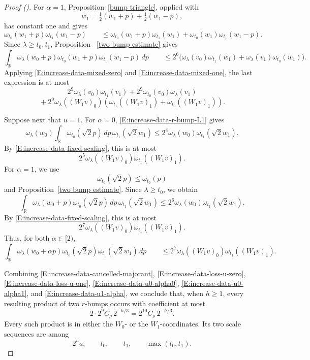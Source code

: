 \documentclass[12pt,reqno]{amsart}
\newcommand{\auto}{{({\tiny\faCar})}}
\theoremstyle{plain}
\numberwithin{equation}{section}
\theoremstyle{remark}
\begin{document}
\begin{proof}[Proof \auto]
For \(\alpha=1\), Proposition~\ref{bump triangle}, applied with
\[
w_1
=
\tfrac12(w_1+p)+\tfrac12(w_1-p),
\]
has constant one and gives
\begin{equation}
    \label{E:increase-data-narrow-triangle}
    \omega_{t_0}(w_1+p) \omega_{t_1}(w_1-p) \qquad\leq \omega_{t_0}(w_1+p)\omega_{t_1}(w_1) + \omega_{t_0}(w_1)\omega_{t_1}(w_1-p).
\end{equation}
Since \(\lambda\geq t_0,t_1\), Proposition~
\ref{two bump estimate} gives
\[
\int_{\mathbb R} \omega_\lambda(w_0+p) \omega_{t_0}(w_1+p) \omega_{t_1}(w_1-p)\,dp \qquad\leq 2^6\Big( \omega_\lambda(v_0)\omega_{t_1}(w_1) + \omega_\lambda(v_1)\omega_{t_0}(w_1) \Big).
\]
Applying \eqref{E:increase-data-mixed-zero} and
\eqref{E:increase-data-mixed-one}, the last expression is at most
\begin{equation}
    \label{E:increase-data-u0-alpha1}
2^9\omega_\lambda(v_0)\omega_{t_1}(v_1)
+2^9\omega_{t_0}(v_0)\omega_\lambda(v_1)
\end{equation}
\[
{}+2^9\omega_\lambda((W_1v)_0)
\left(
\omega_{t_1}((W_1v)_1)
+
\omega_{t_0}((W_1v)_1)
\right).
\]

Suppose next that \(u=1\). For \(\alpha=0\),
\eqref{E:increase-data-r-bump-L1} gives
\[
\omega_\lambda(w_0)
\int_{\mathbb R}\omega_{t_0}(\sqrt2p)\,dp\,
\omega_{t_1}(\sqrt2w_1)
\leq
2^4\omega_\lambda(w_0)\omega_{t_1}(\sqrt2w_1).
\]
By \eqref{E:increase-data-fixed-scaling}, this is at most
\[
2^5\omega_\lambda((W_1v)_0)\omega_{t_1}((W_1v)_1).
\]
For \(\alpha=1\), we use
\[
\omega_{t_0}(\sqrt2p)\leq\omega_{t_0}(p)
\]
and Proposition~\ref{two bump estimate}. Since
\(\lambda\geq t_0\), we obtain
\[
\int_{\mathbb R}\omega_\lambda(w_0+p)\omega_{t_0}(\sqrt2p)\,dp\,
\omega_{t_1}(\sqrt2w_1)
\leq
2^6\omega_\lambda(w_0)\omega_{t_1}(\sqrt2w_1).
\]
By \eqref{E:increase-data-fixed-scaling}, this is at most
\[
2^7\omega_\lambda((W_1v)_0)\omega_{t_1}((W_1v)_1).
\]
Thus, for both \(\alpha\in[2)\),
\begin{equation}
    \label{E:increase-data-u1-alpha}
    \int_{\mathbb R} \omega_\lambda(w_0+\alpha p) \omega_{t_0}(\sqrt2p) \omega_{t_1}(\sqrt2w_1)\,dp \qquad\leq 2^7 \omega_\lambda((W_1v)_0) \omega_{t_1}((W_1v)_1).
\end{equation}

Combining
\eqref{E:increase-data-cancelled-majorant},
\eqref{E:increase-data-loss-u-zero},
\eqref{E:increase-data-loss-u-one},
\eqref{E:increase-data-u0-alpha0},
\eqref{E:increase-data-u0-alpha1}, and
\eqref{E:increase-data-u1-alpha}, we conclude that, when
\(h\geq1\), every resulting product of two \(r\)-bumps occurs with
coefficient at most
\[
2\cdot2^9 C_\rho\,2^{-h/3}
=
2^{10}C_\rho\,2^{-h/3}.
\]
Every such product is in either the \(W_0\)- or the
\(W_1\)-coordinates. Its two scale sequences are among
\[
2^ha,\qquad
t_0,\qquad
t_1,\qquad
\max(t_0,t_1).
\]


\end{proof}
\end{document}
